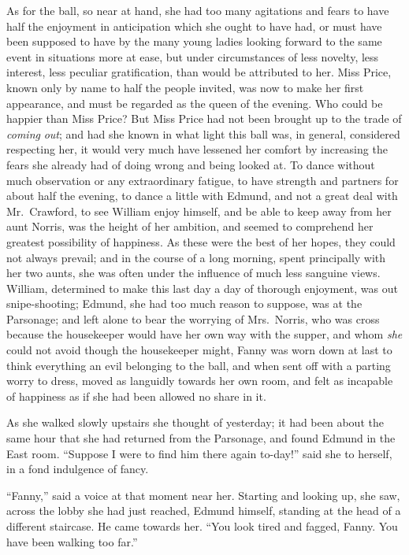 \documentclass{article}
\begin{document}
As for the ball, so near at hand, she had too many
agitations and fears to have half the enjoyment in
anticipation which she ought to have had, or must have
been supposed to have by the many young ladies looking
forward to the same event in situations more at ease,
but under circumstances of less novelty, less interest,
less peculiar gratification, than would be attributed
to her.  Miss Price, known only by name to half the
people invited, was now to make her first appearance,
and must be regarded as the queen of the evening.
Who could be happier than Miss Price?  But Miss Price
had not been brought up to the trade of \emph{coming} \emph{out};
and had she known in what light this ball was, in general,
considered respecting her, it would very much have lessened
her comfort by increasing the fears she already had of doing
wrong and being looked at.  To dance without much observation
or any extraordinary fatigue, to have strength and partners
for about half the evening, to dance a little with Edmund,
and not a great deal with Mr.\ Crawford, to see William
enjoy himself, and be able to keep away from her aunt Norris,
was the height of her ambition, and seemed to comprehend
her greatest possibility of happiness.  As these were
the best of her hopes, they could not always prevail;
and in the course of a long morning, spent principally
with her two aunts, she was often under the influence
of much less sanguine views.  William, determined to
make this last day a day of thorough enjoyment,
was out snipe-shooting; Edmund, she had too much reason
to suppose, was at the Parsonage; and left alone to bear
the worrying of Mrs.\ Norris, who was cross because the
housekeeper would have her own way with the supper,
and whom \emph{she} could not avoid though the housekeeper might,
Fanny was worn down at last to think everything an evil
belonging to the ball, and when sent off with a parting worry
to dress, moved as languidly towards her own room, and felt
as incapable of happiness as if she had been allowed no share in
it.

As she walked slowly upstairs she thought of yesterday;
it had been about the same hour that she had returned
from the Parsonage, and found Edmund in the East room.
``Suppose I were to find him there again to-day!'' said she
to herself, in a fond indulgence of fancy.

``Fanny,'' said a voice at that moment near her.
Starting and looking up, she saw, across the lobby she
had just reached, Edmund himself, standing at the head
of a different staircase.  He came towards her.  ``You look
tired and fagged, Fanny.  You have been walking too far.''
\end{document}
